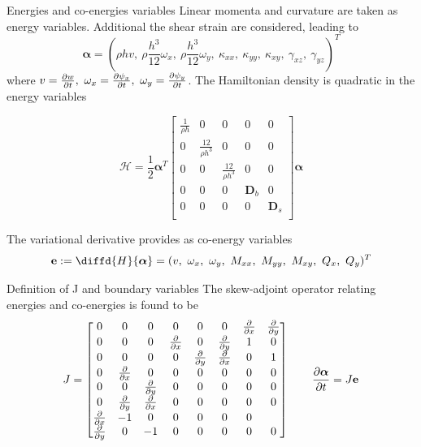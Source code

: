 \documentclass{beamer}
\begin{document}
\begin{frame}{Energies and co-energies variables}
Linear momenta and curvature are taken as energy variables. Additional the shear strain are considered, leading to 
\begin{equation*}
\bm{\alpha} = \left(\rho h v,\ \rho \frac{h^3}{12} \omega_x,\ \rho \frac{h^3}{12} \omega_y,\ \kappa_{xx},\ \kappa_{yy},\ \kappa_{xy},\ \gamma_{xz},\ \gamma_{yz} \right)^T
\end{equation*}
where $v = \diffp{w}{t},\ \omega_x = \diffp{\psi_x}{t},\ \omega_y = \diffp{\psi_y}{t}$. The Hamiltonian density is quadratic in the energy variables

\begin{equation*}
\mathcal{H} = \frac{1}{2} \bm{\alpha}^T \begin{bmatrix}
\frac{1}{\rho h} & 0 & 0 & 0 & 0 \\
0 & \frac{12}{\rho h^3} & 0 & 0 & 0 \\
0 & 0 & \frac{12}{\rho h^3} & 0 & 0 \\
0 & 0 & 0 & \bm{D}_b & 0 \\
0 & 0 & 0 &  0 & \bm{D}_s \\
\end{bmatrix} \bm{\alpha} 
\end{equation*}

The variational derivative provides as co-energy variables
\begin{equation*}
\mathbf{e} := \diffd{H}{\bm{\alpha}} = (v,\ \omega_x, \ \omega_y,\ M_{xx},\ M_{yy},\ M_{xy},\ Q_x, \ Q_y)^T
\end{equation*}
\end{frame}

\begin{frame}{Definition of J and boundary variables}
The skew-adjoint operator relating energies and co-energies is found to be
\begin{equation*}
J = 
\begin{bmatrix}
0 & 0 & 0 & 0 & 0 & 0 & \diffp{}{x} & \diffp{}{y} \\
0 & 0 & 0 & \diffp{}{x} & 0 & \diffp{}{y} & 1 & 0 \\
0 & 0 & 0 & 0 & \diffp{}{y} & \diffp{}{x} & 0 & 1 \\
0 & \diffp{}{x} & 0 & 0 & 0 & 0 & 0 & 0\\
0 & 0 & \diffp{}{y} & 0 & 0 & 0 & 0 & 0\\
0 & \diffp{}{y} & \diffp{}{x} & 0 & 0 & 0 & 0 & 0\\
\diffp{}{x} & -1 & 0 & 0 & 0 & 0 & 0\\
\diffp{}{y} & 0 & -1 & 0 & 0 & 0 & 0 & 0\\
\end{bmatrix} 	\qquad
\diffp{\bm{\alpha}}{t} = J \mathbf{e}
\end{equation*}
\end{frame}
\end{document}
